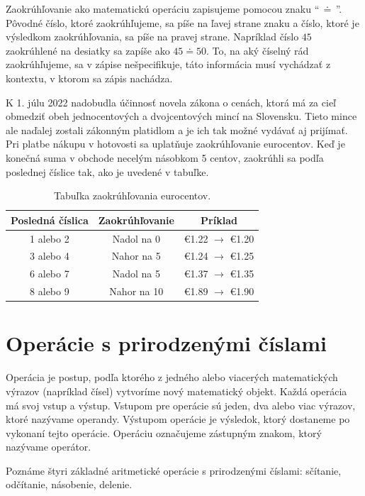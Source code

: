 \documentclass{article}
\begin{document}
Zaokrúhľovanie ako matematickú operáciu zapisujeme pomocou znaku \enquote{\(\, \doteq \,\)}. Pôvodné číslo, ktoré zaokrúhľujeme, sa píše na ľavej strane znaku a číslo, ktoré je výsledkom zaokrúhľovania, sa píše na pravej strane. Napríklad číslo \(45\) zaokrúhlené na desiatky sa zapíše ako \(45 \doteq 50\). To, na aký číselný rád zaokrúhľujeme, sa v zápise nešpecifikuje, táto informácia musí vychádzať z kontextu, v ktorom sa zápis nachádza.

K 1. júlu 2022 nadobudla účinnosť novela zákona o cenách, ktorá má za cieľ obmedziť obeh jednocentových a dvojcentových mincí na Slovensku. Tieto mince ale naďalej zostali zákonným platidlom a je ich tak možné vydávať aj prijímať. Pri platbe nákupu v hotovosti sa uplatňuje zaokrúhľovanie eurocentov. Keď je konečná suma v obchode necelým násobkom 5 centov, zaokrúhli sa podľa poslednej číslice tak, ako je uvedené v tabuľke.

\begin{table}[H]
  \centering
  \renewcommand{\arraystretch}{1.3}
  \begin{tabular}{|c|c|c|}
    \hline
    Posledná číslica & Zaokrúhľovanie & Príklad \\
    \hline
    1 alebo 2 & Nadol na 0 & \euro 1.22 \(\rightarrow\) \euro 1.20 \\
    3 alebo 4 & Nahor na 5 & \euro 1.24 \(\rightarrow\) \euro 1.25 \\
    6 alebo 7 & Nadol na 5 & \euro 1.37 \(\rightarrow\) \euro 1.35 \\
    8 alebo 9 & Nahor na 10 & \euro 1.89 \(\rightarrow\) \euro 1.90 \\
    \hline
  \end{tabular}
  \caption{Tabuľka zaokrúhľovania eurocentov.}
\end{table}

\section{Operácie s prirodzenými číslami}

Operácia je postup, podľa ktorého z jedného alebo viacerých matematických výrazov (napríklad čísel) vytvoríme nový matematický objekt. Každá operácia má svoj vstup a výstup. Vstupom pre operácie sú jeden, dva alebo viac výrazov, ktoré nazývame operandy. Výstupom operácie je výsledok, ktorý dostaneme po vykonaní tejto operácie. Operáciu označujeme zástupným znakom, ktorý nazývame operátor.

Poznáme štyri základné aritmetické operácie s prirodzenými číslami: sčítanie, odčítanie, násobenie, delenie.
\end{document}
